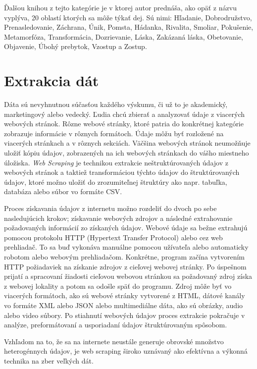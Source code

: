 Ďalšou knihou z tejto kategórie je  \cite{Tobias:1993} v ktorej autor prednáša, ako opäť z názvu vyplýva, 20 oblastí ktorých sa môže týkať dej. Sú nimi: Hľadanie, Dobrodružstvo, Prenasledovanie, Záchrana, Únik, Pomsta, Hádanka, Rivalita, Smoliar, Pokušenie, Metamorfóza, Transformácia, Dozrievanie, Láska, Zakázaná láska, Obetovanie, Objavenie, Úbohý prebytok, Vzostup a Zostup. 


\section{Extrakcia dát}
Dáta sú nevyhnutnou súčasťou každého výskumu, či už to je akademický, marketingový alebo vedecký. Ľudia chcú zbierať a analyzovať údaje z viacerých webových stránok. Rôzne webové stránky, ktoré patria do konkrétnej kategórie zobrazuje informácie v rôznych formátoch. Údaje môžu byť rozložené na viacerých stránkach a v rôznych sekciách. Väčšina webových stránok neumožňuje uložiť kópiu údajov, zobrazených na ich webových stránkach do vášho miestneho úložiska. \textit{Web Scraping} je technikou extrakcie neštruktúrovaných údajov z webových stránok a taktiež transformáciou týchto údajov do štruktúrovaných údajov, ktoré možno uložiť do zrozumiteľnej štruktúry ako napr. tabuľka, databáza alebo súbor vo formáte CSV. 

Proces získavania údajov z internetu možno rozdeliť do dvoch po sebe nasledujúcich krokov; získavanie webových zdrojov a následné extrahovanie požadovaných informácií zo získaných údajov. Webové údaje sa bežne extrahujú pomocou protokolu HTTP (Hypertext Transfer Protocol) alebo cez web prehliadač. To sa buď vykonáva manuálne pomocou užívateľa alebo automaticky robotom alebo webovým prehliadačom. Konkrétne, program začína vytvorením HTTP požiadaviek na získanie zdrojov z cieľovej webovej stránky. Po úspešnom prijatí a spracovaní žiadosti cieľovou webovou stránkou sa požadovaný zdroj získa z webovej lokality a potom sa odošle späť do programu. Zdroj môže byť vo viacerých formátoch, ako sú webové stránky vytvorené z HTML, dátové kanály vo formáte XML alebo JSON alebo multimediálne dáta, ako sú obrázky, audio alebo video súbory. Po stiahnutí webových údajov proces extrakcie pokračuje v analýze, preformátovaní a usporiadaní údajov štruktúrovaným spôsobom. 

Vzhľadom na to, že sa na internete neustále generuje obrovské množstvo heterogénnych údajov, je web scraping široko uznávaný ako efektívna a výkonná technika na zber veľkých dát. 

